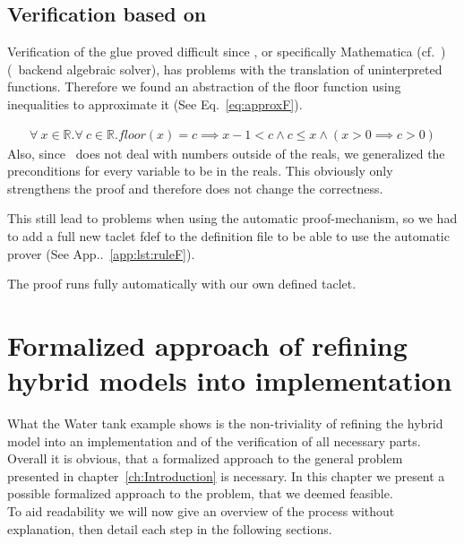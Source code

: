 \section{Verification based on \keym}
\label{sec:Watertank:Verification}

Verification of the glue proved difficult since \keym, or specifically Mathematica (cf.~\cite{mathematica}) (\keym~backend algebraic solver), has problems with the translation of uninterpreted functions. Therefore we found an abstraction of the floor function using inequalities to approximate it (See Eq.~\ref{eq:approxF}). 

\begin{align*}
		\forall~x \in \mathbb{R}. \forall~c \in \mathbb{R}. floor(x) = c \implies x-1 < c \wedge c \leq x \wedge( x>0\implies c>0)
	\label{eq:approxF}
\end{align*}
Also, since \keym~does not deal with numbers outside of the reals, we generalized the preconditions for every variable to be in the reals. This obviously only strengthens the proof and therefore does not change the correctness.

This still lead to problems when using the automatic proof-mechanism, so we had to add a full new taclet fdef to the definition file to be able to use the automatic prover (See App..~\ref{app:lst:ruleF}).

The proof runs fully automatically with our own defined taclet.

\chapter{Formalized approach of refining hybrid models into implementation}
\label{ch:Process}

What the Water tank example shows is the non-triviality of refining the hybrid model into an implementation and of the verification of all necessary parts. Overall it is obvious, that a formalized approach to the general problem presented in chapter~\ref{ch:Introduction} is necessary. In this chapter we present a possible formalized approach to the problem, that we deemed feasible.
\\


To aid readability we will now give an overview of the process without explanation, then detail each step in the following sections. 

